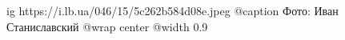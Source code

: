  
 
 
 
 

\ifcmt
  ig https://i.lb.ua/046/15/5c262b584d08e.jpeg
	@caption Фото: Иван Станиславский
  @wrap center
  @width 0.9
\fi
